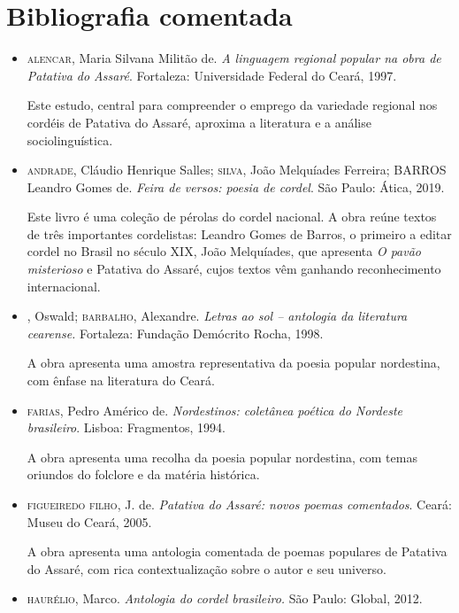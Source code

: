 \documentclass[12pt]{extarticle}
\begin{document}
\section{Bibliografia comentada}

\begin{itemize}

\item \textsc{alencar}, Maria Silvana Militão de. \textit{A linguagem regional
popular na obra de Patativa do Assaré}. Fortaleza: Universidade
Federal do Ceará, 1997.

Este estudo, central para compreender o emprego da variedade regional
nos cordéis de Patativa do Assaré, aproxima a literatura e a análise
sociolinguística.

\item \textsc{andrade}, Cláudio Henrique Salles; \textsc{silva}, João Melquíades Ferreira;
BARROS Leandro Gomes de. \textit{Feira de versos: poesia de cordel}.
São Paulo: Ática, 2019.

Este livro é uma coleção de pérolas do cordel nacional. A obra reúne
textos de três importantes cordelistas: Leandro Gomes de Barros, o
primeiro a editar cordel no Brasil no século XIX, João Melquíades, que
apresenta \emph{O pavão misterioso} e Patativa do Assaré, cujos textos
vêm ganhando reconhecimento internacional.

\item {}, Oswald; \textsc{barbalho}, Alexandre. \textit{Letras ao sol --
antologia da literatura cearense.} Fortaleza: Fundação Demócrito
Rocha, 1998.

A obra apresenta uma amostra representativa da poesia popular
nordestina, com ênfase na literatura do Ceará.

\item \textsc{farias}, Pedro Américo de. \textit{Nordestinos: coletânea poética do
Nordeste brasileiro}. Lisboa: Fragmentos, 1994.

A obra apresenta uma recolha da poesia popular nordestina, com temas
oriundos do folclore e da matéria histórica.

\item \textsc{figueiredo filho}, J. de. \textit{Patativa do Assaré: novos poemas
comentados}. Ceará: Museu do Ceará, 2005.

A obra apresenta uma antologia comentada de poemas populares de Patativa
do Assaré, com rica contextualização sobre o autor e seu universo.

\item \textsc{haurélio}, Marco. \textit{Antologia do cordel brasileiro.} São Paulo:
Global, 2012.


\end{itemize}
\end{document}
